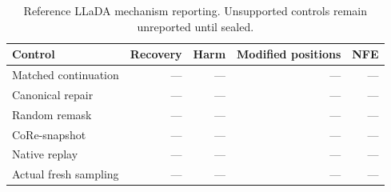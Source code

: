 \begin{table}[t]
\caption{Reference LLaDA mechanism reporting. Unsupported controls remain unreported until sealed.}
\label{tab:reference-mechanism}
\centering\small
\begin{tabular}{lrrrr}
\toprule
Control & Recovery & Harm & Modified positions & NFE \\
\midrule
Matched continuation & --- & --- & --- & --- \\
Canonical repair & --- & --- & --- & --- \\
Random remask & --- & --- & --- & --- \\
CoRe-snapshot & --- & --- & --- & --- \\
Native replay & --- & --- & --- & --- \\
Actual fresh sampling & --- & --- & --- & --- \\
\bottomrule
\end{tabular}
\end{table}
